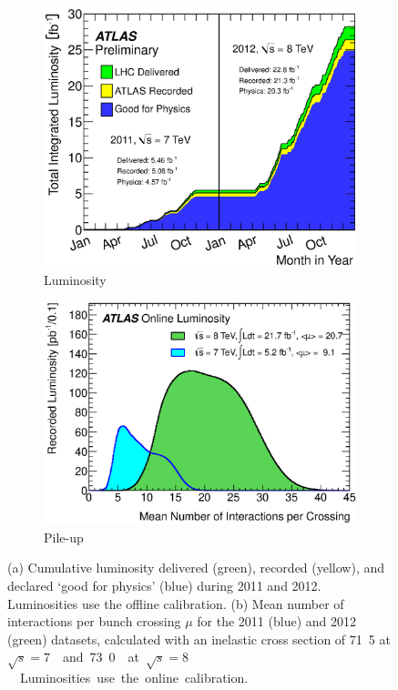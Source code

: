 \begin{figure}[h]
	\begin{subfigure}[b]{0.495\textwidth}
		\includegraphics[width=\textwidth]{tex/experiment/luminosity}
		\caption{Luminosity}
		\label{fig:dataset:lumi}
	\end{subfigure}
	\hfill
	\begin{subfigure}[b]{0.495\textwidth}
		\includegraphics[width=\textwidth]{tex/experiment/pileup}
		\caption{Pile-up}
		\label{fig:dataset:pileup}
	\end{subfigure}
	\caption{(a) Cumulative luminosity delivered (green), recorded (yellow), and declared 
	`good for physics' (blue) during 2011 and 2012. Luminosities use the offline 
	calibration.
	(b) Mean number of interactions per bunch crossing $\mu$ for the 2011 (blue) and 
	2012 (green) datasets, calculated with an inelastic \pp cross section of 
	\unit{71.5}{\milli\barn} at \unit{$\sqrt{s} = 7$}{\TeV} and 
	\unit{73.0}{\milli\barn} at \unit{$\sqrt{s} = 8$}{\TeV}.
	Luminosities use the online calibration.}
	\label{fig:dataset}
\end{figure}

